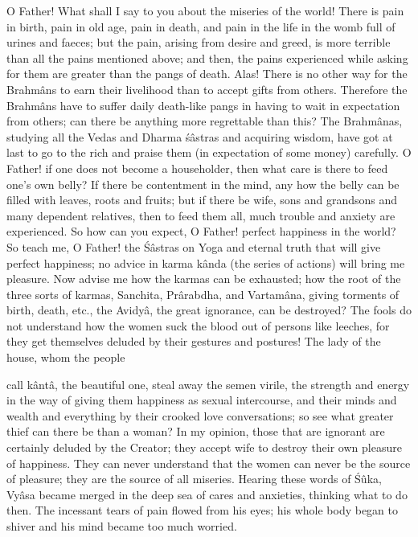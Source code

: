 O Father! What shall I say to you about the miseries of the world! There is pain in birth, pain in old age, pain in death, and pain in the life in the womb full of urines and faeces; but the pain, arising from desire and greed, is more terrible than all the pains mentioned above; and then, the pains experienced while asking for them are greater than the pangs of death. Alas! There is no other way for the Brahm\^ans to earn their livelihood than to accept gifts from others. Therefore the Brahm\^ans have to suffer daily death-like pangs in having to wait in expectation from others; can there be anything more regrettable than this? The Brahm\^anas, studying all the Vedas and Dharma \'s\^astras and acquiring wisdom, have got at last to go to the rich and praise them (in expectation of some money) carefully. O Father! if one does not become a householder, then what care is there to feed one's own belly? If there be contentment in the mind, any how the belly can be filled with leaves, roots and fruits; but if there be wife, sons and grandsons and many dependent relatives, then to feed them all, much trouble and anxiety are experienced. So how can you expect, O Father! perfect happiness in the world? So teach me, O Father! the \'S\^astras on Yoga and eternal truth that will give perfect happiness; no advice in karma k\^anda (the series of actions) will bring me pleasure. Now advise me how the karmas can be exhausted; how the root of the three sorts of karmas, Sanchita, Pr\^arabdha, and Vartam\^ana, giving torments of birth, death, etc., the Avidy\^a, the great ignorance, can be destroyed? The fools do not understand how the women suck the blood out of persons like leeches, for they get themselves deluded by their gestures and postures! The lady of the house, whom the people

call k\^ant\^a, the beautiful one, steal away the semen virile, the strength and energy in the way of giving them happiness as sexual intercourse, and their minds and wealth and everything by their crooked love conversations; so see what greater thief can there be than a woman? In my opinion, those that are ignorant are certainly deluded by the Creator; they accept wife to destroy their own pleasure of happiness. They can never understand that the women can never be the source of pleasure; they are the source of all miseries. Hearing these words of \'S\^uka, Vy\^asa became merged in the deep sea of cares and anxieties, thinking what to do then. The incessant tears of pain flowed from his eyes; his whole body began to shiver and his mind became too much worried.

